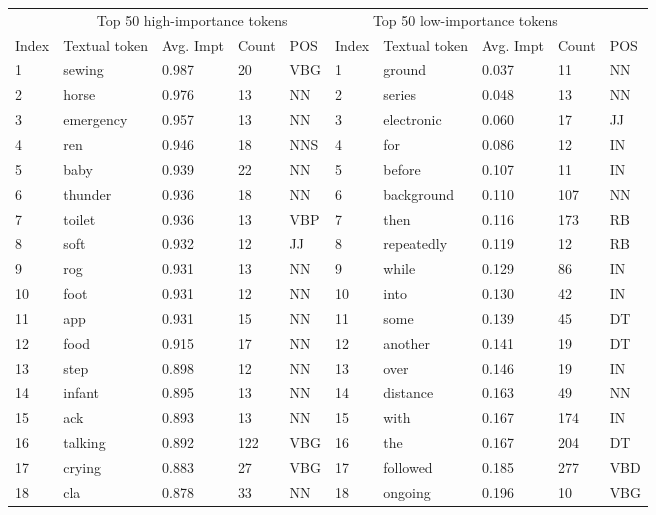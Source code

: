 \begin{table*}[!ht]
    \centering
    \begin{tabular}{lllll|lllll}
    \toprule
      & \multicolumn{4}{c|}{Top 50 high-importance tokens}& \multicolumn{4}{c}{Top 50 low-importance tokens} \\
        Index & Textual token & Avg. Impt & Count & POS & Index & Textual token & Avg. Impt & Count & POS \\ 
        \midrule
        1 & sewing & 0.987 & 20 & VBG & 1 & ground & 0.037 & 11 & NN \\ 
        2 & horse & 0.976 & 13 & NN & 2 & series & 0.048 & 13 & NN \\ 
        3 & emergency & 0.957 & 13 & NN & 3 & electronic & 0.060 & 17 & JJ \\ 
        4 & ren & 0.946 & 18 & NNS & 4 & for & 0.086 & 12 & IN \\ 
        5 & baby & 0.939 & 22 & NN & 5 & before & 0.107 & 11 & IN \\ 
        6 & thunder & 0.936 & 18 & NN & 6 & background & 0.110 & 107 & NN \\ 
        7 & toilet & 0.936 & 13 & VBP & 7 & then & 0.116 & 173 & RB \\ 
        8 & soft & 0.932 & 12 & JJ & 8 & repeatedly & 0.119 & 12 & RB \\ 
        9 & rog & 0.931 & 13 & NN & 9 & while & 0.129 & 86 & IN \\ 
        10 & foot & 0.931 & 12 & NN & 10 & into & 0.130 & 42 & IN \\ 
        11 & app & 0.931 & 15 & NN & 11 & some & 0.139 & 45 & DT \\ 
        12 & food & 0.915 & 17 & NN & 12 & another & 0.141 & 19 & DT \\ 
        13 & step & 0.898 & 12 & NN & 13 & over & 0.146 & 19 & IN \\ 
        14 & infant & 0.895 & 13 & NN & 14 & distance & 0.163 & 49 & NN \\ 
        15 & ack & 0.893 & 13 & NN & 15 & with & 0.167 & 174 & IN \\ 
        16 & talking & 0.892 & 122 & VBG & 16 & the & 0.167 & 204 & DT \\ 
        17 & crying & 0.883 & 27 & VBG & 17 & followed & 0.185 & 277 & VBD \\ 
        18 & cla & 0.878 & 33 & NN & 18 & ongoing & 0.196 & 10 & VBG \\ 

\end{tabular}
\end{table*}
